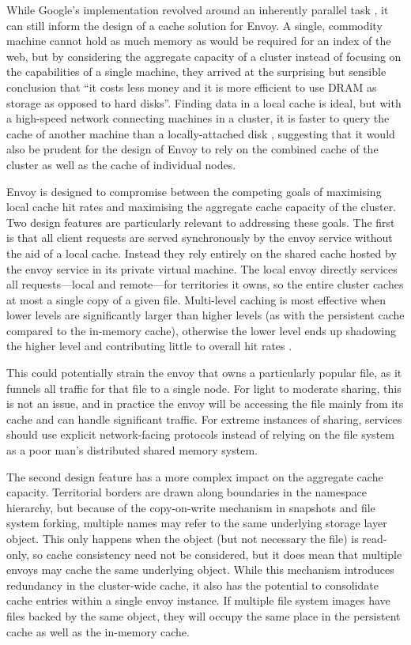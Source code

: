 While Google's implementation revolved around an inherently parallel task \cite{barroso03}, it can still inform the design of a cache solution for Envoy. A single, commodity machine cannot hold as much memory as would be required for an index of the web, but by considering the aggregate capacity of a cluster instead of focusing on the capabilities of a single machine, they arrived at the surprising but sensible conclusion that ``it costs less money and it is more efficient to use DRAM as storage as opposed to hard disks''. Finding data in a local cache is ideal, but with a high-speed network connecting machines in a cluster, it is faster to query the cache of another machine than a locally-attached disk \cite{dahlin94b}, suggesting that it would also be prudent for the design of Envoy to rely on the combined cache of the cluster as well as the cache of individual nodes.

Envoy is designed to compromise between the competing goals of maximising local cache hit rates and maximising the aggregate cache capacity of the cluster. Two design features are particularly relevant to addressing these goals. The first is that all client requests are served synchronously by the envoy service without the aid of a local cache. Instead they rely entirely on the shared cache hosted by the envoy service in its private virtual machine. The local envoy directly services all requests---local and remote---for territories it owns, so the entire cluster caches at most a single copy of a given file. Multi-level caching is most effective when lower levels are significantly larger than higher levels (as with the persistent cache compared to the in-memory cache), otherwise the lower level ends up shadowing the higher level and contributing little to overall hit rates \cite{muntz}.

This could potentially strain the envoy that owns a particularly popular file, as it funnels all traffic for that file to a single node. For light to moderate sharing, this is not an issue, and in practice the envoy will be accessing the file mainly from its cache and can handle significant traffic. For extreme instances of sharing, services should use explicit network-facing protocols instead of relying on the file system as a poor man's distributed shared memory system.

The second design feature has a more complex impact on the aggregate cache capacity. Territorial borders are drawn along boundaries in the namespace hierarchy, but because of the copy-on-write mechanism in snapshots and file system forking, multiple names may refer to the same underlying storage layer object. This only happens when the object (but not necessary the file) is read-only, so cache consistency need not be considered, but it does mean that multiple envoys may cache the same underlying object. While this mechanism introduces redundancy in the cluster-wide cache, it also has the potential to consolidate cache entries within a single envoy instance. If multiple file system images have files backed by the same object, they will occupy the same place in the persistent cache as well as the in-memory cache.

